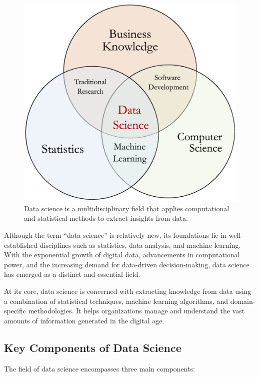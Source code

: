 \documentclass[
]{book}
\theoremstyle{definition}
\theoremstyle{definition}
\theoremstyle{definition}
\theoremstyle{definition}
\theoremstyle{remark}
\begin{document}
\begin{figure}

{\centering \includegraphics[width=0.5\linewidth]{images/ch2_data_science} 

}

\caption{Data science is a multidisciplinary field that applies computational and statistical methods to extract insights from data.}\label{fig:Data-Science}
\end{figure}

Although the term ``data science'' is relatively new, its foundations lie in well-established disciplines such as statistics, data analysis, and machine learning. With the exponential growth of digital data, advancements in computational power, and the increasing demand for data-driven decision-making, data science has emerged as a distinct and essential field.

At its core, data science is concerned with extracting knowledge from data using a combination of statistical techniques, machine learning algorithms, and domain-specific methodologies. It helps organizations manage and understand the vast amounts of information generated in the digital age.

\subsection*{Key Components of Data Science}\label{key-components-of-data-science}

The field of data science encompasses three main components:
\end{document}
